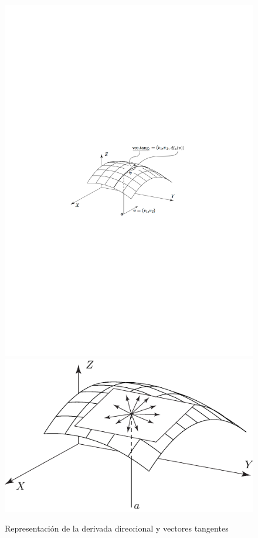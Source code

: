 \begin{figure}[p]
\begin{center}
\includegraphics{T2/figs/direccionales.pdf}\\[3cm]
\includegraphics{T2/figs/plano-tangente.pdf}
\end{center}
\caption{Representación de la derivada direccional y vectores tangentes}%
\label{fig:der-dir}
\end{figure}

